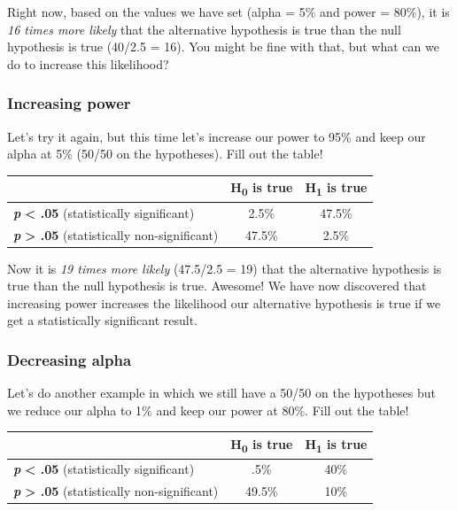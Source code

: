 \documentclass[
]{book}
\begin{document}
Right now, based on the values we have set (alpha = 5\% and power = 80\%), it is \emph{16 times more likely} that the alternative hypothesis is true than the null hypothesis is true (40/2.5 = 16). You might be fine with that, but what can we do to increase this likelihood?

\hypertarget{increasing-power}{%
\subsubsection{Increasing power}\label{increasing-power}}

Let's try it again, but this time let's increase our power to 95\% and keep our alpha at 5\% (50/50 on the hypotheses). Fill out the table!

\begin{longtable}[]{@{}lcc@{}}
\toprule
& H\textsubscript{0} is true & H\textsubscript{1} is true \\
\midrule
\endhead
\textbf{\emph{p}} \textbf{\textless{} .05} (statistically significant) & 2.5\% & 47.5\% \\
\textbf{\emph{p}} \textbf{\textgreater{} .05} (statistically non-significant) & 47.5\% & 2.5\% \\
\bottomrule
\end{longtable}

Now it is \emph{19 times more likely} (47.5/2.5 = 19) that the alternative hypothesis is true than the null hypothesis is true. Awesome! We have now discovered that increasing power increases the likelihood our alternative hypothesis is true if we get a statistically significant result.

\hypertarget{decreasing-alpha}{%
\subsubsection{Decreasing alpha}\label{decreasing-alpha}}

Let's do another example in which we still have a 50/50 on the hypotheses but we reduce our alpha to 1\% and keep our power at 80\%. Fill out the table!

\begin{longtable}[]{@{}lcc@{}}
\toprule
& H\textsubscript{0} is true & H\textsubscript{1} is true \\
\midrule
\endhead
\textbf{\emph{p}} \textbf{\textless{} .05} (statistically significant) & .5\% & 40\% \\
\textbf{\emph{p}} \textbf{\textgreater{} .05} (statistically non-significant) & 49.5\% & 10\% \\
\bottomrule
\end{longtable}
\end{document}

